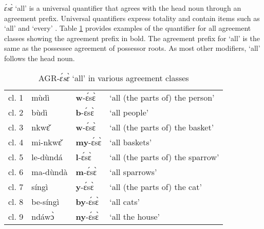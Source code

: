 
{\itshape ɛ́sɛ̀}  `all' is a universal quantifier that  agrees with the head noun through an agreement prefix.  Universal quantifiers express totality and contain items such as `all' and `every' \citep[394]{zerbian2008}. Table \ref{Tab:All} provides examples of the quantifier for all agreement classes showing the agreement prefix in bold. The agreement prefix for `all' is the same as the possessee agreement of possessor roots. As most other modifiers, `all' follows the head noun.

\begin{table} 
\centering
\begin{tabular}{llll}
 \midrule
cl. 1 & mùdì & {\bfseries w}-ɛ́sɛ̀ & `all (the parts of) the person' \\
cl. 2 & bùdì & {\bfseries b}-ɛ́sɛ̀ & `all people' \\
cl. 3 & nkwɛ̌ & {\bfseries w}-ɛ́sɛ̀ & `all (the parts of) the basket' \\
cl. 4 & mi-nkwɛ̌ & {\bfseries my}-ɛ́sɛ̀ & `all baskets' \\
cl. 5 & le-dùndá & {\bfseries l}-ɛ́sɛ̀ & `all (the parts of) the sparrow' \\
cl. 6 & ma-dùndà & {\bfseries m}-ɛ́sɛ̀ & `all sparrows' \\
cl. 7 & síngì & {\bfseries y}-ɛ́sɛ̀ & `all (the parts of) the cat' \\
cl. 8 & be-síngì & {\bfseries by}-ɛ́sɛ̀ & `all cats' \\
cl. 9 & ndáwɔ̀ & {\bfseries ny}-ɛ́sɛ̀ & `all the house' \\
 \midrule
\end{tabular}
\caption{AGR-{\itshape ɛ́sɛ̀} `all' in various agreement classes}
\label{Tab:All}
\end{table}

